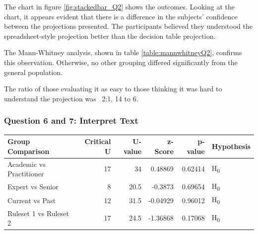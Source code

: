 The chart in figure \ref{fig:stackedbar_Q2} shows the outcomes.
Looking at the chart, it appears evident that there is a difference in the subjects' confidence between the projections presented.
The participants believed they understood the spreadsheet-style projection better than the decision table projection.

The Mann-Whitney analysis, shown in table \ref{table:mannwhitneyQ2}, confirms this observation.
Otherwise, no other grouping differed significantly from the general population.

The ratio of those evaluating it as easy to those thinking it was hard to understand the projection was ~2:1, 14 to 6.

\subsubsection{Question 6 and 7: Interpret Text}
\noindent\begin{minipage}{\linewidth}
    \centering
    \label{fig:stackedbar_Q3}
    
    \begin{tabular}{ |l ||r |r |r | r|l | } 
        \hline
        Group Comparison                 & Critical U & U-value & z-Score  & p-value & Hypothesis         \\
        \hline
        \hline
        Academic vs Practitioner         & 17         & 34      &  0.48869 & 0.62414 & H\textsubscript{0} \\ 
        \hline
        Expert vs Senior                 & 8          & 20.5    &  -0.3873 & 0.69654 & H\textsubscript{0} \\ 
        \hline
        Current vs Past                  & 12         & 31.5    &  -0.04929& 0.96012 & H\textsubscript{0} \\ 
        \hline
        Ruleset 1 vs Ruleset 2           & 17         & 24.5    &  -1.36868& 0.17068 & H\textsubscript{0} \\ 
        \hline
    \end{tabular}
    \label{table:mannwhitneyQ3}
\end{minipage} 


